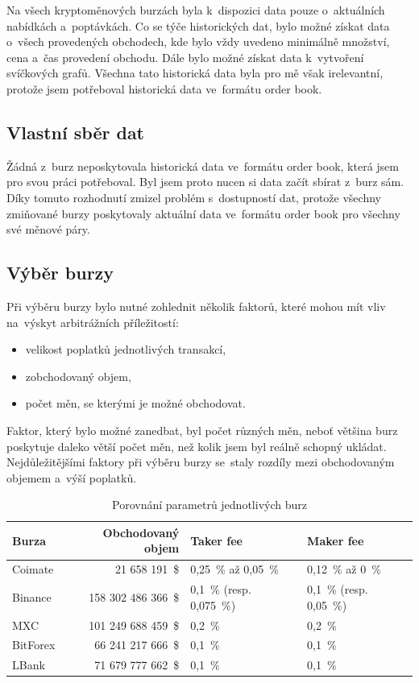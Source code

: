 \documentclass[thesis=B,czech]{FITthesis}[2019/03/21]
\begin{document}
Na všech kryptoměnových burzách byla k~dispozici data pouze o~aktuálních nabídkách a~poptávkách. Co se týče historických dat, bylo možné získat data o~všech provedených obchodech, kde bylo vždy uvedeno minimálně množství, cena a~čas provedení obchodu. Dále bylo možné získat data k~vytvoření svíčkových grafů. Všechna tato historická data byla pro mě však irelevantní, protože jsem potřeboval historická data ve~formátu order book. \cite{BinanceApi, BitForexApi, LBankApi, CoinMateApi, MXCApi}

\subsection{Vlastní sběr dat}
Žádná z~burz neposkytovala historická data ve~formátu order book, která jsem pro svou práci potřeboval. Byl jsem proto nucen si data začít sbírat z~burz sám. Díky tomuto rozhodnutí zmizel problém s~dostupností dat, protože všechny zmiňované burzy poskytovaly aktuální data ve~formátu order book pro všechny své měnové páry.

\subsection{Výběr burzy}
Při výběru burzy bylo nutné zohlednit několik faktorů, které mohou mít vliv na~výskyt arbitrážních příležitostí: 
\begin{itemize}
    \item velikost poplatků jednotlivých transakcí,
    \item zobchodovaný objem,
    \item počet měn, se kterými je možné obchodovat.
\end{itemize}
Faktor, který bylo možné zanedbat, byl počet různých měn, neboť většina burz poskytuje daleko větší počet měn, než kolik jsem byl reálně schopný ukládat. Nejdůležitějšími faktory při výběru burzy se~staly rozdíly mezi obchodovaným objemem a~výší poplatků.

\begin{table}\centering
     \caption{Porovnání parametrů jednotlivých burz}
     \label{exchanges_comparison}
     \begin{tabular}{||l | r | l | l||} 
     \hline
     Burza & Obchodovaný objem & Taker fee & Maker fee \\ [0.5ex]
     \hline\hline
     Coimate & 21 658 191~\$ & 0,25~\% až 0,05~\% & 0,12~\% až 0~\%  \\ 
     \hline
     Binance & 158 302 486 366~\$ & 0,1~\% (resp. 0,075~\%) & 0,1~\% (resp. 0,05~\%)  \\ 
     \hline
     MXC & 101 249 688 459~\$ & 0,2~\% & 0,2~\%  \\ 
     \hline
     BitForex & 66 241 217 666~\$ & 0,1~\% & 0,1~\%  \\ 
     \hline
     LBank & 71 679 777 662~\$ & 0,1~\% & 0,1~\%  \\ 
     \hline
    \end{tabular}
\end{table}
\end{document}
